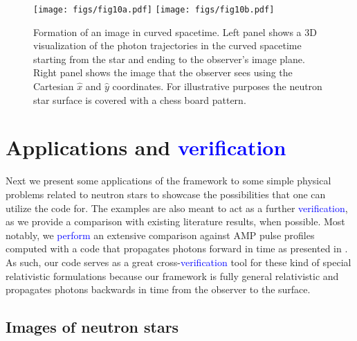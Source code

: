 \documentclass{aa}
\newcommand{\refe}[1]{\textcolor{blue}{{#1}}}
\newcommand{\refedel}[1]{}
\newcommand{\lgamma}{\gamma_{\text{L}}}
\begin{document}
\begin{figure}
\centering
\texttt{[image: figs/fig10a.pdf]}
\texttt{[image: figs/fig10b.pdf]}
\caption{\label{fig:image}
  Formation of an image in curved spacetime.
  Left panel shows a 3D visualization of the photon trajectories in the curved spacetime starting from the star and ending to the observer's image plane.
  Right panel shows the image that the observer sees using the Cartesian $\hat{x}$ and $\hat{y}$ coordinates.
  For illustrative purposes the neutron star surface is covered with a chess board pattern.
  }
\end{figure}


\section{Applications and \refe{verification}}\label{sect:appl}

Next we present some applications of the framework to some simple physical problems related to neutron stars to showcase the possibilities that one can utilize the code for.
The examples are also meant to act as a further \refe{verification}, as we provide a comparison with existing literature results, when possible.
Most notably, we \refedel{employ}\refe{perform} an extensive comparison against AMP pulse profiles computed with a code that propagates photons forward in time as presented in \citet{PB06}.
As such, our code serves as a great cross-\refe{verification} tool for these kind of special relativistic formulations because our framework is fully general relativistic and propagates photons backwards in time from the observer to the surface.




\subsection{Images of neutron stars}
\end{document}
